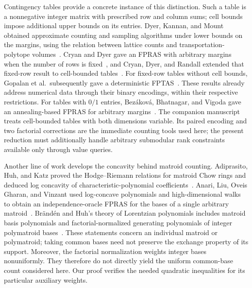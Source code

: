 Contingency tables provide a concrete instance of this distinction.
Such a table is a nonnegative integer matrix with prescribed row and
column sums; cell bounds impose additional upper bounds on its entries.
Dyer, Kannan, and Mount obtained approximate counting and sampling
algorithms under lower bounds on the margins, using the relation between
lattice counts and transportation-polytope volumes~\cite{DKM1997}.
Cryan and Dyer gave an FPRAS with arbitrary margins when the number of
rows is fixed~\cite{CD2003}, and Cryan, Dyer, and Randall extended that
fixed-row result to cell-bounded tables~\cite{CDR2010}. For fixed-row
tables without cell bounds, Gopalan et al.\ subsequently gave a
deterministic FPTAS~\cite[Theorem~1.3]{GKM2011}. These results
already address numerical data through their binary encodings, within
their respective restrictions. For tables with $0/1$ entries,
Bez{\'a}kov{\'a}, Bhatnagar, and Vigoda gave an annealing-based FPRAS
for arbitrary margins~\cite{BBV2007}. The companion manuscript~\cite{CB} treats
cell-bounded tables with both dimensions variable. Its paired encoding
and two factorial corrections are the immediate counting tools used
here; the present reduction must additionally handle arbitrary
submodular rank constraints available only through value queries.

Another line of work develops the concavity behind matroid counting.
Adiprasito, Huh, and Katz proved the Hodge--Riemann relations for matroid
Chow rings and deduced log concavity of characteristic-polynomial
coefficients~\cite{AHK2018}. Anari, Liu, Oveis Gharan, and Vinzant used
log-concave polynomials and high-dimensional walks to obtain an
independence-oracle FPRAS for the bases of a single arbitrary
matroid~\cite{ALOV2024}. Br{\"a}nd{\'e}n and Huh's theory of Lorentzian
polynomials includes matroid basis polynomials and factorial-normalized
generating polynomials of integer polymatroid bases~\cite{BH2020}.
These statements concern an individual matroid or polymatroid; taking
common bases need not preserve the exchange property of its support.
Moreover, the factorial normalization weights integer bases nonuniformly.
They therefore do not directly yield the uniform common-base count
considered here. Our proof verifies the needed quadratic inequalities
for its particular auxiliary weights.

